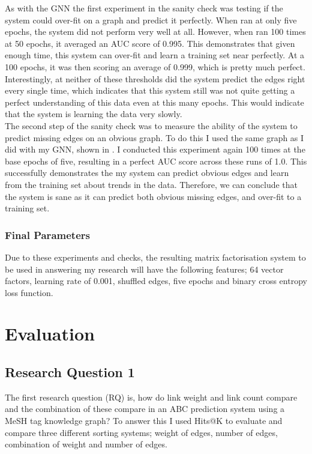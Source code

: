 \documentclass{l4proj}
\begin{document}
As with the GNN the first experiment in the sanity check was testing if the system could over-fit on a graph and predict it perfectly. When ran at only five epochs, the system did not perform very well at all. However, when ran 100 times at 50 epochs, it averaged an AUC score of 0.995. This demonstrates that given enough time, this system can over-fit and learn a training set near perfectly. At a 100 epochs, it was then scoring an average of 0.999, which is pretty much perfect. Interestingly, at neither of these thresholds did the system predict the edges right every single time, which indicates that this system still was not quite getting a perfect understanding of this data even at this many epochs. This would indicate that the system is learning the data very slowly.\\

The second step of the sanity check was to measure the ability of the system to predict missing edges on an obvious graph. To do this I used the same graph as I did with my GNN, shown in . I conducted this experiment again 100 times at the base epochs of five, resulting in a perfect AUC score across these runs of 1.0. This successfully demonstrates the my system can predict obvious edges and learn from the training set about trends in the data. Therefore, we can conclude that the system is sane as it can predict both obvious missing edges, and over-fit to a training set. \\

\subsection{Final Parameters}

Due to these experiments and checks, the resulting matrix factorisation system to be used in answering my research will have the following features; 64 vector factors, learning rate of 0.001, shuffled edges, five epochs and binary cross entropy loss function. \\

\chapter{Evaluation} 

\section{Research Question 1}

The first research question (RQ) is, how do link weight and link count compare and the combination of these compare in an ABC prediction system using a MeSH tag knowledge graph? To answer this I used Hits@K to evaluate and compare three different sorting systems; weight of edges, number of edges, combination of weight and number of edges. \\
\end{document}
